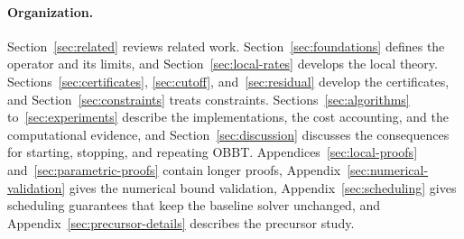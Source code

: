 \paragraph{Organization.} Section~\ref{sec:related} reviews related work.
Section~\ref{sec:foundations} defines the operator and its limits, and
Section~\ref{sec:local-rates} develops the local theory.
Sections~\ref{sec:certificates}, \ref{sec:cutoff}, and~\ref{sec:residual}
develop the certificates, and Section~\ref{sec:constraints} treats
constraints. Sections~\ref{sec:algorithms} to~\ref{sec:experiments} describe
the implementations, the cost accounting, and the computational evidence,
and Section~\ref{sec:discussion} discusses the consequences for starting,
stopping, and repeating OBBT. Appendices~\ref{sec:local-proofs}
and~\ref{sec:parametric-proofs} contain longer proofs,
Appendix~\ref{sec:numerical-validation} gives the numerical bound validation,
Appendix~\ref{sec:scheduling} gives scheduling guarantees that keep the
baseline solver unchanged, and Appendix~\ref{sec:precursor-details}
describes the precursor study.

